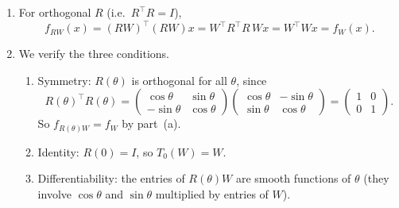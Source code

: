 \documentclass[11pt]{article}
\begin{document}
\begin{solution}
\begin{enumerate}
    \item For orthogonal $R$ (i.e.\ $R^\top R = I$),
    \begin{equation*}
        f_{RW}(x) = (RW)^\top(RW)x = W^\top R^\top R\, W x = W^\top W x = f_W(x).
    \end{equation*}

    \item We verify the three conditions.
    \begin{enumerate}[label=(\roman*)]
        \item Symmetry: $R(\theta)$ is orthogonal for all $\theta$, since
        \begin{equation*}
            R(\theta)^\top R(\theta)
            = \begin{pmatrix}
                \cos\theta & \sin\theta \\
                -\sin\theta & \cos\theta
            \end{pmatrix}
            \begin{pmatrix}
                \cos\theta & -\sin\theta \\
                \sin\theta & \cos\theta
            \end{pmatrix}
            = \begin{pmatrix}
                1 & 0 \\ 0 & 1
            \end{pmatrix}.
        \end{equation*}
        So $f_{R(\theta)W} = f_W$ by part~(a).
        \item Identity: $R(0) = I$, so $T_0(W) = W$.
        \item Differentiability: the entries of $R(\theta)W$ are smooth functions of $\theta$ (they involve $\cos\theta$ and $\sin\theta$ multiplied by entries of $W$).
    \end{enumerate}


\end{enumerate}
\end{solution}
\end{document}
